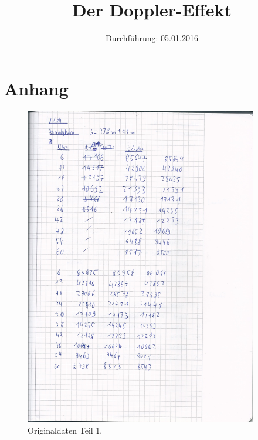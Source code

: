 

\subject{Versuchsprotokoll zum Versuch Nr. 104}
\title{Der Doppler-Effekt}
\date{
  Durchführung: 05.01.2016
}



\maketitle
\newpage







\section{Anhang}
\begin{figure}[H]
  \centering
  \includegraphics[height=14cm]{oringinal-1.jpg}
  \caption{Originaldaten Teil 1.}
  \label{fig:original1}
\end{figure}

